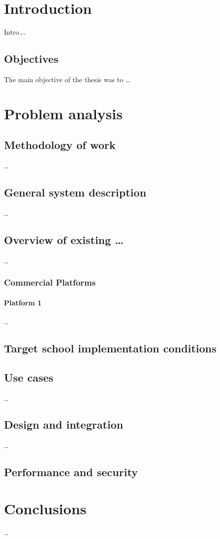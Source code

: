 \chapter{Introduction}
Intro\ldots\cite{yo:07}. 

\section{Objectives}
\label{sec:Objectives}
The main objective of the thesis\cite{6079245} was to \ldots

\chapter{Problem analysis}
\label{chap:Problemanalysis}

\section{Methodology of work}
\ldots


\section{General system description}
\label{sec:Problemanalysis}
\ldots

\section{Overview of existing \ldots}
\ldots

\subsection{Commercial Platforms}
\label{sec:commercial_platforms}

\subsubsection{Platform 1}
\ldots


\section{Target school implementation conditions}

\section{Use cases}
\ldots

\section{Design and integration}
\ldots

\section{Performance and security}
\label{sec:performandsec}

\chapter{Conclusions}
\ldots